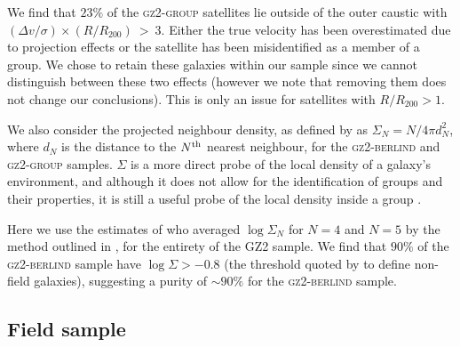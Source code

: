 \documentclass[useAMS,usenatbib]{mn2e}
\begin{document}
We find that $23\%$ of the \textsc{gz2-group} satellites lie outside of the outer caustic with $(\Delta v/\sigma)\times(R/R_{200})~>~3$. Either the true velocity has been overestimated due to projection effects or the satellite has been misidentified as a member of a group. We chose to retain these galaxies within our sample since we cannot distinguish between these two effects (however we note that removing them does not change our conclusions). This is only an issue for satellites with $R/R_{200} > 1$.

We also consider the projected neighbour density, as defined by \cite{Baldry06} as $\Sigma_N = N/4\pi d_N^2$, where $d_N$ is the distance to the $N^{\rm{th}}$ nearest neighbour, for the \textsc{gz2-berlind} and \textsc{gz2-group} samples. $\Sigma$ is a more direct probe of the local density of a galaxy's environment, and although it does not allow for the identification of groups and their properties, it is still a useful probe of the local density inside a group  \cite[see][for a comparison of various environment parametrisations]{muldrew12}.

Here we use the estimates of \cite{Bamford09} who averaged $\log\Sigma_N$ for $N = 4$ and $N=5$ by the method outlined in \citet{Baldry06}, for the entirety of the GZ2 sample. We find that $90\%$ of the \textsc{gz2-berlind} sample have $\log\Sigma > -0.8$ (the threshold quoted by \citealt{Baldry06} to define non-field galaxies), suggesting a purity of $\sim90\%$ for the \textsc{gz2-berlind} sample.

\subsection{Field sample}\label{sec:field}
\end{document}
